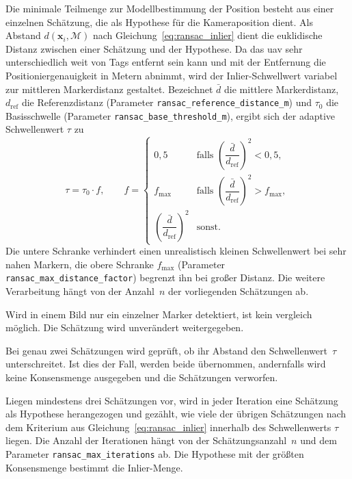 Die minimale Teilmenge zur Modellbestimmung der Position besteht aus einer einzelnen Schätzung, die als Hypothese für die Kameraposition dient.
Als Abstand $d(\mathbf{x}_i, \mathcal{M})$ nach Gleichung~\eqref{eq:ransac_inlier} dient die euklidische Distanz zwischen einer Schätzung und der Hypothese.
Da das \gls{uav} sehr unterschiedlich weit von Tags entfernt sein kann und mit der Entfernung die Positioniergenauigkeit in Metern abnimmt,
wird der Inlier-Schwellwert variabel zur mittleren Markerdistanz gestaltet.
Bezeichnet $\bar{d}$ die mittlere Markerdistanz, $d_{\mathrm{ref}}$ die Referenzdistanz (Parameter \texttt{ransac\_reference\_\-distance\_m})
und $\tau_0$ die Basisschwelle (Parameter \texttt{ransac\_base\_\-threshold\_m}), ergibt sich der adaptive Schwellenwert $\tau$ zu
\begin{equation}
\tau = \tau_0 \cdot f, \qquad
f =
\begin{cases}
0{,}5 & \text{falls } \left(\dfrac{\bar{d}}{d_{\mathrm{ref}}}\right)^{2} < 0{,}5, \\[2ex]
f_{\max} & \text{falls } \left(\dfrac{\bar{d}}{d_{\mathrm{ref}}}\right)^{2} > f_{\max}, \\[2ex]
\left(\dfrac{\bar{d}}{d_{\mathrm{ref}}}\right)^{2} & \text{sonst.}
\end{cases}
\label{eq:pos_ransac_schwelle}
\end{equation}
Die untere Schranke verhindert einen unrealistisch kleinen Schwellenwert bei sehr nahen Markern, 
die obere Schranke $f_{\max}$ (Parameter \texttt{ransac\_max\_distance\_factor}) begrenzt ihn bei großer Distanz.
Die weitere Verarbeitung hängt von der Anzahl~$n$ der vorliegenden Schätzungen ab.

Wird in einem Bild nur ein einzelner Marker detektiert, ist kein vergleich möglich. 
Die Schätzung wird unverändert weitergegeben.

Bei genau zwei Schätzungen wird geprüft, ob ihr Abstand den Schwellenwert~$\tau$ unterschreitet. 
Ist dies der Fall, werden beide übernommen, andernfalls wird keine Konsensmenge ausgegeben und die Schätzungen verworfen.

Liegen mindestens drei Schätzungen vor, wird in jeder Iteration eine Schätzung als Hypothese herangezogen und gezählt, 
wie viele der übrigen Schätzungen nach dem Kriterium aus Gleichung~\eqref{eq:ransac_inlier} innerhalb des Schwellenwerts $\tau$ liegen.
Die Anzahl der Iterationen hängt von der Schätzungsanzahl~$n$ und dem Parameter \texttt{ransac\_max\_iterations} ab.
Die Hypothese mit der größten Konsensmenge bestimmt die Inlier-Menge.

